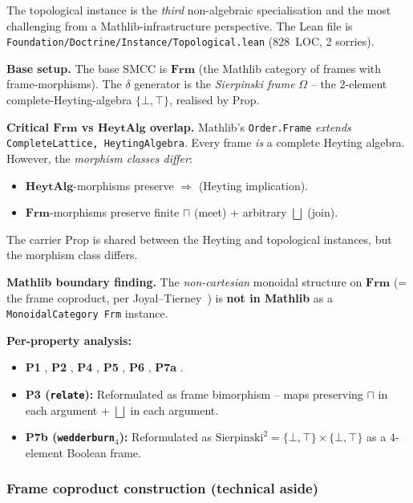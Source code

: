 \documentclass[11pt,a4paper]{article}
\theoremstyle{plain}
\theoremstyle{definition}
\theoremstyle{remark}
\newcommand{\cat}[1]{\mathbf{#1}}
\newcommand{\HeytAlg}{\cat{HeytAlg}}
\newcommand{\Frm}{\cat{Frm}}
\newcommand{\Sierp}{\mathrm{Sierpinski}}
\newcommand{\smcc}{SMCC}
\begin{document}
The topological instance is the \emph{third} non-algebraic specialisation and the most challenging from a Mathlib-infrastructure perspective. The Lean file is \texttt{Foundation/Doctrine/Instance/Topological.lean} (828~LOC, 2 sorries).

\textbf{Base setup.} The base \smcc{} is $\Frm$ (the Mathlib category of frames with frame-morphisms). The $\delta$ generator is the \emph{Sierpinski frame} $\Omega$ -- the 2-element complete-Heyting-algebra $\{\bot, \top\}$, realised by $\mathrm{Prop}$.

\textbf{Critical $\Frm$ vs $\HeytAlg$ overlap.} Mathlib's \texttt{Order.Frame} \emph{extends} \texttt{CompleteLattice, HeytingAlgebra}. Every frame \emph{is} a complete Heyting algebra. However, the \emph{morphism classes differ}:
\begin{itemize}[leftmargin=*]
\item $\HeytAlg$-morphisms preserve $\Rightarrow$ (Heyting implication).
\item $\Frm$-morphisms preserve finite $\sqcap$ (meet) + arbitrary $\bigsqcup$ (join).
\end{itemize}

The carrier $\mathrm{Prop}$ is shared between the Heyting and topological instances, but the morphism class differs.

\textbf{Mathlib boundary finding.} The \emph{non-cartesian} monoidal structure on $\Frm$ (= the frame coproduct, per Joyal--Tierney~\cite{JT84}) is \textbf{not in Mathlib} as a \texttt{MonoidalCategory Frm} instance.

\textbf{Per-property analysis:}

\begin{itemize}[leftmargin=*]
\item \textbf{P1} \checkmark{}, \textbf{P2} \checkmark{}, \textbf{P4} \checkmark{}, \textbf{P5} \checkmark{}, \textbf{P6} \checkmark{}, \textbf{P7a} \checkmark{}.
\item \textbf{P3 (\texttt{relate}):} Reformulated as frame bimorphism -- maps preserving $\sqcap$ in each argument + $\bigsqcup$ in each argument.
\item \textbf{P7b (\texttt{wedderburn}$_4$):} Reformulated as $\Sierp^2 = \{\bot, \top\} \times \{\bot, \top\}$ as a 4-element Boolean frame.
\end{itemize}

\subsubsection{Frame coproduct construction (technical aside)}\label{sec:inst:topological:coprod}
\end{document}
